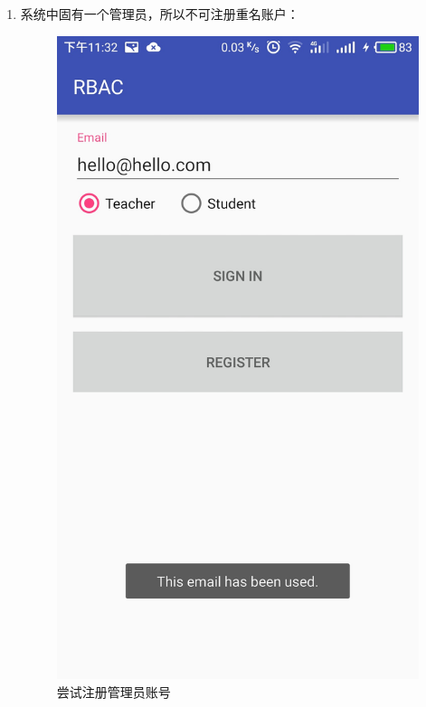 \begin{itemize}
\begin{enumerate}
\begin{itemize}
\begin{enumerate}
				\item 系统中固有一个管理员，所以不可注册重名账户：
				\begin{figure}[H]
					\centering
					\includegraphics[height=0.39\textheight]{snapshot/13}
					\caption{尝试注册管理员账号}
					\label{fig:13}
				\end{figure}
			

\end{enumerate}
\end{itemize}
\end{enumerate}
\end{itemize}
